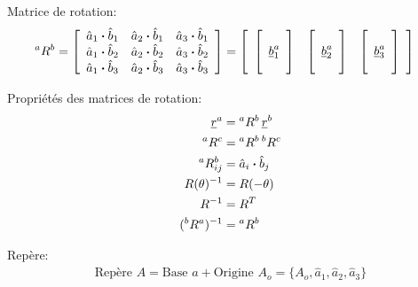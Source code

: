 Matrice de rotation:
\begin{align}
{}^aR^b &= 
\left[ \begin{array}{c c c} 
\hat{a}_1 \boldsymbol{\cdot} \hat{b}_1 & \hat{a}_2 \boldsymbol{\cdot} \hat{b}_1 & \hat{a}_3 \boldsymbol{\cdot} \hat{b}_1 \\
\hat{a}_1 \boldsymbol{\cdot} \hat{b}_2 & \hat{a}_2 \boldsymbol{\cdot} \hat{b}_2 & \hat{a}_3 \boldsymbol{\cdot} \hat{b}_2 \\
\hat{a}_1 \boldsymbol{\cdot} \hat{b}_3 & \hat{a}_2 \boldsymbol{\cdot} \hat{b}_3 & \hat{a}_3 \boldsymbol{\cdot} \hat{b}_3 
\end{array} \right] = 
\left[ \begin{array}{c c c} 
	\left[ \begin{array}{c} \\ \underline{b}_1^a \\  \\ \end{array}  \right] & \left[ \begin{array}{c} \\ \underline{b}_2^a \\  \\ \end{array}  \right] & \left[ \begin{array}{c} \\ \underline{b}_3^a \\  \\ \end{array}  \right]
\end{array} \right]
\end{align} 

Propriétés des matrices de rotation:
\begin{align}
\underline{r}^a &= {}^aR^b \, \underline{r}^b \\
{}^aR^c &=  {}^aR^b \, {}^bR^c \\
{}^aR^b_{ij} &= \hat{a}_i \boldsymbol{\cdot} \hat{b}_j \\
R(\theta)^{-1} &= R(-\theta) \\
R^{-1} &= R^T \\
({}^bR^a)^{-1} &= {}^aR^b
\end{align}


Repère:
\begin{align}
\text{Repère } A  = \text{Base } a + \text{Origine } A_o = \{ A_o , \hat{a}_{1} , \hat{a}_{2} , \hat{a}_{3} \} 
\end{align} 

